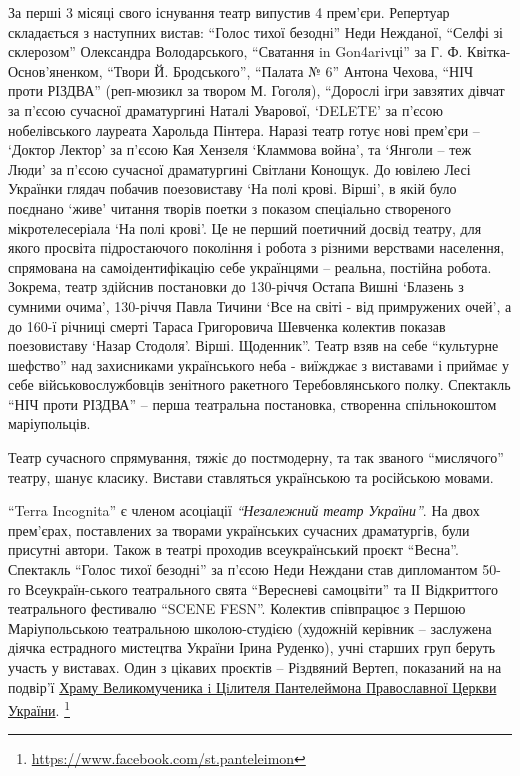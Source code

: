 За перші 3 місяці свого існування театр випустив 4 прем'єри. Репертуар
складається з наступних вистав: \enquote{Голос тихої безодні} Неди Нежданої, \enquote{Селфі зі
склерозом} Олександра Володарського, \enquote{Сватання in Gon4arivці} за
Г. Ф. Квітка-Основ'яненком, \enquote{Твори Й. Бродського}, \enquote{Палата № 6} Антона Чехова,
\enquote{НІЧ проти РІЗДВА} (реп-мюзикл за твором М. Гоголя), \enquote{Дорослі ігри завзятих
дівчат за п'єсою сучасної драматургині Наталі Уварової, \enquote{DELETE} за п'єсою
нобелівського лауреата Харольда Пінтера. Наразі театр готує нові прем'єри –
\enquote{Доктор Лектор} за п'єсою Кая Хензеля \enquote{Кламмова война}, та \enquote{Янголи – теж Люди}
за п'єсою сучасної драматургині Світлани Конощук. До ювілею Лесі Українки
глядач побачив поезовиставу \enquote{На полі крові. Вірші}, в якій було поєднано \enquote{живе}
читання творів поетки з показом спеціально створеного мікротелесеріала \enquote{На полі
крові}.  Це не перший поетичний досвід театру, для якого просвіта підростаючого
покоління і робота з різними верствами населення, спрямована на
самоідентифікацію себе українцями – реальна, постійна робота. Зокрема, театр
здійснив постановки до 130-річчя Остапа Вишні \enquote{Блазень з сумними очима},
130-річчя Павла Тичини \enquote{Все на світі - від примружених очей}, а до 160-ї
річниці смерті Тараса Григоровича Шевченка колектив показав поезовиставу \enquote{Назар
Стодоля}. Вірші. Щоденник}. Театр взяв на себе \enquote{культурне шефство} над
захисниками українського неба - виїжджає з виставами і приймає у себе
військовослужбовців зенітного ракетного Теребовлянського полку. Спектакль \enquote{НІЧ
проти РІЗДВА} – перша театральна постановка, створенна спільнокоштом
маріупольців.


Театр сучасного спрямування, тяжіє до постмодерну, та так званого \enquote{мислячого}
театру, шанує класику. Вистави ставляться українською та російською мовами.

\enquote{Terra Incognita} є членом асоціації \emph{\enquote{Незалежний театр України}}. На двох
прем'єрах, поставлених за творами українських сучасних драматургів, були
присутні автори. Також в театрі проходив всеукраїнський проєкт \enquote{Весна}.
Спектакль \enquote{Голос тихої безодні} за п'єсою Неди Неждани став дипломантом 50-го
Всеукраїн\hyp{}ського театрального свята \enquote{Вересневі самоцвіти} та ІІ Відкриттого
театрального фестивалю \enquote{SCENE FESN}. Колектив співпрацює з Першою
Маріупольською театральною школою-студією (художній керівник – заслужена
діячка естрадного мистецтва України Ірина Руденко), учні старших груп беруть
участь у виставах. Один з цікавих проєктів – Різдвяний Вертеп, показаний на на
подвір'ї \href{https://www.facebook.com/st.panteleimon}{Храму Великомученика i Цiлителя Пантелеймона Православної Церкви
України}.%
\footnote{\url{https://www.facebook.com/st.panteleimon}}

